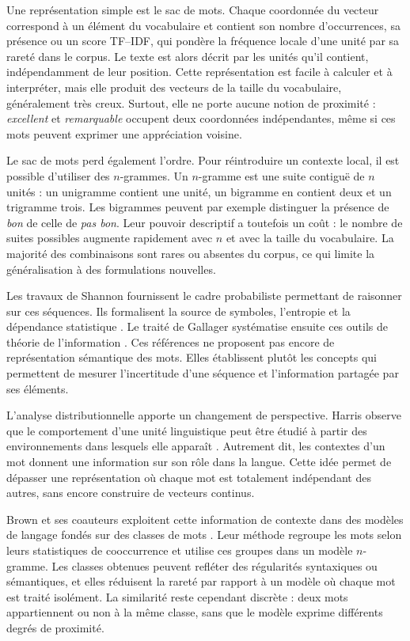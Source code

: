 Une représentation simple est le sac de mots. Chaque coordonnée du vecteur
correspond à un élément du vocabulaire et contient son nombre d'occurrences, sa
présence ou un score TF--IDF, qui pondère la fréquence locale d'une unité par sa
rareté dans le corpus. Le texte est alors décrit par les unités qu'il contient,
indépendamment de leur position. Cette représentation est
facile à calculer et à interpréter, mais elle produit des vecteurs de la taille
du vocabulaire, généralement très creux. Surtout, elle ne porte aucune notion
de proximité : \emph{excellent} et \emph{remarquable} occupent deux coordonnées
indépendantes, même si ces mots peuvent exprimer une appréciation voisine.

Le sac de mots perd également l'ordre. Pour réintroduire un contexte local, il
est possible d'utiliser des $n$-grammes. Un $n$-gramme est une suite contiguë de
$n$ unités : un unigramme contient une unité, un bigramme en contient deux et
un trigramme trois. Les bigrammes peuvent par exemple distinguer la présence de
\emph{bon} de celle de \emph{pas bon}. Leur pouvoir descriptif a toutefois un
coût : le nombre de suites possibles augmente rapidement avec $n$ et avec la
taille du vocabulaire. La majorité des combinaisons sont rares ou absentes du
corpus, ce qui limite la généralisation à des formulations nouvelles.

Les travaux de Shannon fournissent le cadre probabiliste permettant de raisonner
sur ces séquences. Ils formalisent la source de symboles, l'entropie et la
dépendance statistique \cite{shannon1948communication}. Le
traité de Gallager systématise ensuite ces outils de théorie de l'information
\cite{gallager1968information}. Ces références ne proposent pas encore de
représentation sémantique des mots. Elles établissent plutôt les concepts qui
permettent de mesurer l'incertitude d'une séquence et l'information partagée par
ses éléments.

L'analyse distributionnelle apporte un changement de perspective. Harris
observe que le comportement d'une unité linguistique peut être étudié à partir
des environnements dans lesquels elle apparaît
\cite{harris1954distributional}. Autrement dit, les contextes d'un mot donnent
une information sur son rôle dans la langue. Cette idée permet de dépasser une
représentation où chaque mot est totalement indépendant des autres, sans encore
construire de vecteurs continus.

Brown et ses coauteurs exploitent cette information de contexte dans des
modèles de langage fondés sur des classes de mots
\cite{brown1992class}. Leur méthode regroupe les mots selon leurs statistiques
de cooccurrence et utilise ces groupes dans un modèle $n$-gramme. Les classes
obtenues peuvent refléter des régularités syntaxiques ou sémantiques, et elles
réduisent la rareté par rapport à un modèle où chaque mot est traité isolément.
La similarité reste cependant discrète : deux mots appartiennent ou non à la
même classe, sans que le modèle exprime différents degrés de proximité.

